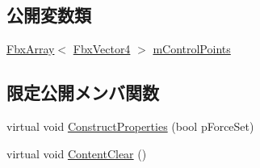 \subsection*{公開変数類}
\begin{DoxyCompactItemize}
\item 
\hyperlink{class_fbx_array}{Fbx\+Array}$<$ \hyperlink{class_fbx_vector4}{Fbx\+Vector4} $>$ \hyperlink{class_fbx_geometry_base_a88c6c0552ceb07b3a638cc3175fbe867}{m\+Control\+Points}
\end{DoxyCompactItemize}
\subsection*{限定公開メンバ関数}
\begin{DoxyCompactItemize}
\item 
virtual void \hyperlink{class_fbx_geometry_base_a94ee142ac1d40be3aebb4d9441431921}{Construct\+Properties} (bool p\+Force\+Set)
\item 
virtual void \hyperlink{class_fbx_geometry_base_acf13ddd2717d2f1ca4dc57b5ea0801b1}{Content\+Clear} ()
\end{DoxyCompactItemize}
